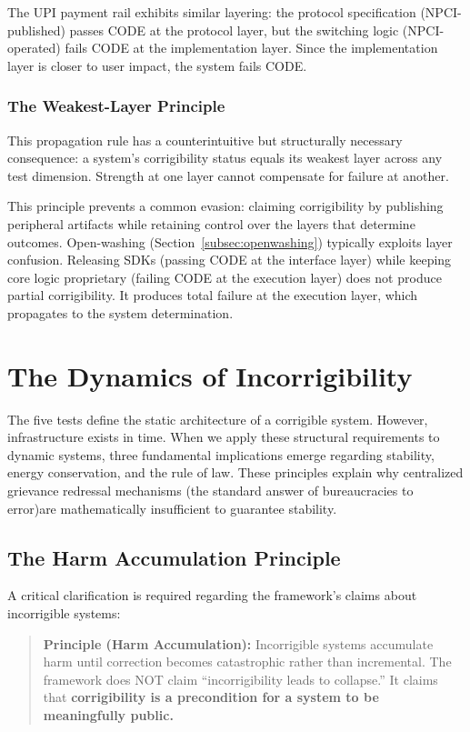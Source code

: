 \documentclass{article}
\begin{document}
The UPI payment rail exhibits similar layering: the protocol specification (NPCI-published) passes CODE at the protocol layer, but the switching logic (NPCI-operated) fails CODE at the implementation layer. Since the implementation layer is closer to user impact, the system fails CODE.

\subsubsection{The Weakest-Layer Principle}

This propagation rule has a counterintuitive but structurally necessary consequence: a system's corrigibility status equals its weakest layer across any test dimension. Strength at one layer cannot compensate for failure at another.

This principle prevents a common evasion: claiming corrigibility by publishing peripheral artifacts while retaining control over the layers that determine outcomes. Open-washing (Section~\ref{subsec:openwashing}) typically exploits layer confusion. Releasing SDKs (passing CODE at the interface layer) while keeping core logic proprietary (failing CODE at the execution layer) does not produce partial corrigibility. It produces total failure at the execution layer, which propagates to the system determination.

\section{The Dynamics of Incorrigibility}
\label{sec:dynamics}

The five tests define the static architecture of a corrigible system. However, infrastructure exists in time. When we apply these structural requirements to dynamic systems, three fundamental implications emerge regarding stability, energy conservation, and the rule of law. These principles explain why centralized grievance redressal mechanisms (the standard answer of bureaucracies to error)are mathematically insufficient to guarantee stability.

\subsection{The Harm Accumulation Principle}

A critical clarification is required regarding the framework's claims about incorrigible systems:

\begin{quote}
\textbf{Principle (Harm Accumulation):} Incorrigible systems accumulate harm until correction becomes catastrophic rather than incremental. The framework does NOT claim ``incorrigibility leads to collapse.'' It claims that \textbf{corrigibility is a precondition for a system to be meaningfully public.}
\end{quote}
\end{document}
